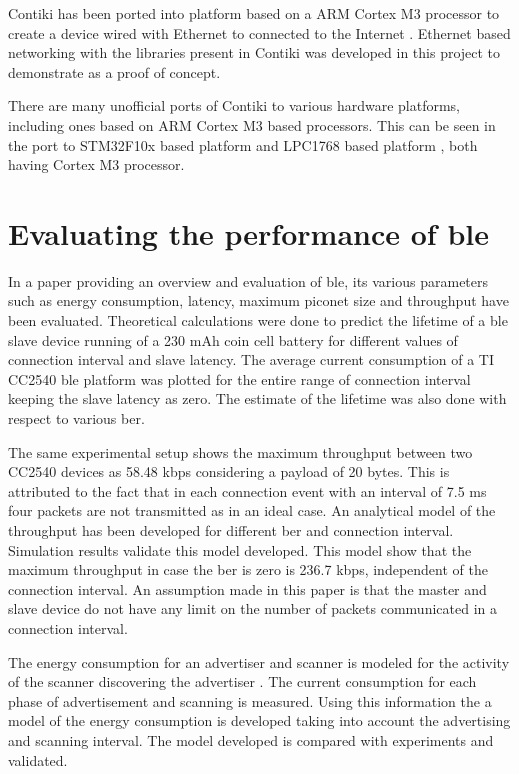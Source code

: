 Contiki has been ported into platform based on a ARM Cortex M3 processor to create a device wired with Ethernet to connected to the Internet \cite{Wilde2013a}. Ethernet based networking with the libraries present in Contiki was developed in this project to demonstrate as a proof of concept.

There are many unofficial ports of Contiki to various hardware platforms, including ones based on ARM Cortex M3 based processors. This can be seen in the port to STM32F10x based platform \cite{Padrah} and LPC1768 based platform \cite{Tanyingyong2013}, both having Cortex M3 processor.

\section{Evaluating the performance of \gls{ble}}
In a paper \cite{Gomez2012} providing an overview and evaluation of \gls{ble}, its various parameters such as energy consumption, latency, maximum piconet size and throughput have been evaluated. Theoretical calculations were done to predict the lifetime of a \gls{ble} slave device running of a 230 mAh coin cell battery for different values of connection interval and slave latency. The average current consumption of a TI CC2540 \gls{ble} platform was plotted for the entire range of connection interval keeping the slave latency as zero. The estimate of the lifetime was also done with respect to various \gls{ber}. 

The same experimental setup \cite{Gomez2012} shows the maximum throughput between two CC2540 devices as 58.48 kbps considering a payload of 20 bytes. This is attributed to the fact that in each connection event with an interval of 7.5 ms four packets are not transmitted as in an ideal case. An analytical model of the throughput \cite{Gomez2011} has been developed for different \gls{ber} and connection interval. Simulation results validate this model developed. This model show that the maximum throughput in case the \gls{ber} is zero is 236.7 kbps, independent of the connection interval. An assumption made in this paper is that the master and slave device do not have any limit on the number of packets communicated in a connection interval. 

The energy consumption for an advertiser and scanner is modeled for the activity of the scanner discovering the advertiser \cite{liu2012energy}. The current consumption for each phase of advertisement and scanning is measured. Using this information the a model of the energy consumption is developed taking into account the advertising and scanning interval. The model developed is compared with experiments and validated. 

